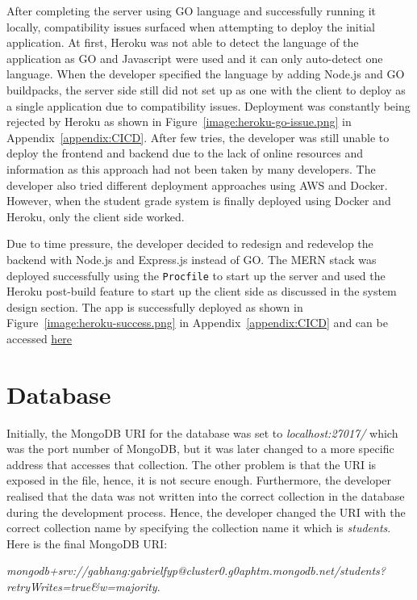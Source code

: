 After completing the server using GO language and successfully running it locally, compatibility issues surfaced when attempting to deploy the initial application. At first, Heroku was not able to detect the language of the application as GO and Javascript were used and it can only auto-detect one language. When the developer specified the language by adding Node.js and GO buildpacks, the server side still did not set up as one with the client to deploy as a single application due to compatibility issues. Deployment was constantly being rejected by Heroku as shown in Figure~\ref{image:heroku-go-issue.png} in Appendix~\ref{appendix:CICD}. After few tries, the developer was still unable to deploy the frontend and backend due to the lack of online resources and information as this approach had not been taken by many developers. The developer also tried different deployment approaches using AWS and Docker. However, when the student grade system is finally deployed using Docker and Heroku, only the client side worked. 

Due to time pressure, the developer decided to redesign and redevelop the backend with Node.js and Express.js instead of GO. The MERN stack was deployed successfully using the \texttt{Procfile} to start up the server and used the Heroku post-build feature to start up the client side as discussed in the system design section. The app is successfully deployed as shown in Figure~\ref{image:heroku-success.png} in Appendix~\ref{appendix:CICD} and can be accessed \href{https://student-grade-system.herokuapp.com/}{here} 

\section{Database}
Initially, the MongoDB URI for the database was set to \textit{localhost:27017/} which was the port number of MongoDB, but it was later changed to a more specific address that accesses that collection. The other problem is that the URI is exposed in the file, hence, it is not secure enough. Furthermore, the developer realised that the data was not written into the correct collection in the database during the development process. Hence, the developer changed the URI with the correct collection name by specifying the collection name it which is \textit{students}. Here is the final MongoDB URI: 

\textit{mongodb+srv://gabhang:gabrielfyp@cluster0.g0aphtm.mongodb.net/students?\newline retryWrites=true\&w=majority}. 

